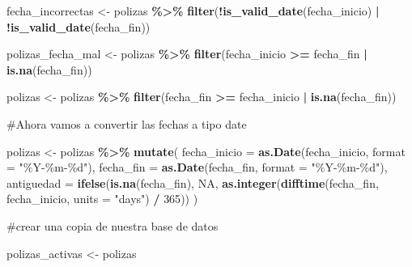 \documentclass[
]{article}
\newenvironment{Shaded}{\begin{snugshade}}{\end{snugshade}}
\newcommand{\AttributeTok}[1]{\textcolor[rgb]{0.13,0.29,0.53}{#1}}
\newcommand{\ConstantTok}[1]{\textcolor[rgb]{0.56,0.35,0.01}{#1}}
\newcommand{\DecValTok}[1]{\textcolor[rgb]{0.00,0.00,0.81}{#1}}
\newcommand{\FunctionTok}[1]{\textcolor[rgb]{0.13,0.29,0.53}{\textbf{#1}}}
\newcommand{\NormalTok}[1]{#1}
\newcommand{\OtherTok}[1]{\textcolor[rgb]{0.56,0.35,0.01}{#1}}
\newcommand{\SpecialCharTok}[1]{\textcolor[rgb]{0.81,0.36,0.00}{\textbf{#1}}}
\newcommand{\StringTok}[1]{\textcolor[rgb]{0.31,0.60,0.02}{#1}}
\begin{document}
\begin{Shaded}
\begin{Highlighting}[]
\NormalTok{fecha\_incorrectas }\OtherTok{\textless{}{-}}\NormalTok{ polizas }\SpecialCharTok{\%\textgreater{}\%}
  \FunctionTok{filter}\NormalTok{(}\SpecialCharTok{!}\FunctionTok{is\_valid\_date}\NormalTok{(fecha\_inicio) }\SpecialCharTok{|} \SpecialCharTok{!}\FunctionTok{is\_valid\_date}\NormalTok{(fecha\_fin))}

\NormalTok{polizas\_fecha\_mal }\OtherTok{\textless{}{-}}\NormalTok{ polizas }\SpecialCharTok{\%\textgreater{}\%}
  \FunctionTok{filter}\NormalTok{(fecha\_inicio }\SpecialCharTok{\textgreater{}=}\NormalTok{ fecha\_fin }\SpecialCharTok{|} \FunctionTok{is.na}\NormalTok{(fecha\_fin))}

\NormalTok{polizas }\OtherTok{\textless{}{-}}\NormalTok{ polizas }\SpecialCharTok{\%\textgreater{}\%}
  \FunctionTok{filter}\NormalTok{(fecha\_fin }\SpecialCharTok{\textgreater{}=}\NormalTok{ fecha\_inicio }\SpecialCharTok{|} \FunctionTok{is.na}\NormalTok{(fecha\_fin))}
\end{Highlighting}
\end{Shaded}

\#Ahora vamos a convertir las fechas a tipo date

\begin{Shaded}
\begin{Highlighting}[]
\NormalTok{polizas }\OtherTok{\textless{}{-}}\NormalTok{ polizas }\SpecialCharTok{\%\textgreater{}\%}
  \FunctionTok{mutate}\NormalTok{(}
    \AttributeTok{fecha\_inicio =} \FunctionTok{as.Date}\NormalTok{(fecha\_inicio, }\AttributeTok{format =} \StringTok{"\%Y{-}\%m{-}\%d"}\NormalTok{),}
    \AttributeTok{fecha\_fin =} \FunctionTok{as.Date}\NormalTok{(fecha\_fin, }\AttributeTok{format =} \StringTok{"\%Y{-}\%m{-}\%d"}\NormalTok{),}
    \AttributeTok{antiguedad =} \FunctionTok{ifelse}\NormalTok{(}\FunctionTok{is.na}\NormalTok{(fecha\_fin), }\ConstantTok{NA}\NormalTok{, }\FunctionTok{as.integer}\NormalTok{(}\FunctionTok{difftime}\NormalTok{(fecha\_fin, fecha\_inicio, }\AttributeTok{units =} \StringTok{"days"}\NormalTok{) }\SpecialCharTok{/} \DecValTok{365}\NormalTok{))}
\NormalTok{  )}
\end{Highlighting}
\end{Shaded}

\#crear una copia de nuestra base de datos

\begin{Shaded}
\begin{Highlighting}[]
\NormalTok{polizas\_activas }\OtherTok{\textless{}{-}}\NormalTok{ polizas}
\end{Highlighting}
\end{Shaded}
\end{document}
